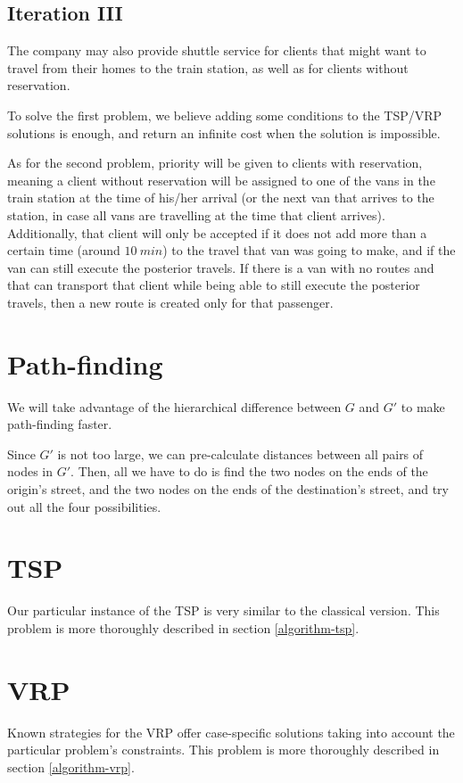 \subsection{Iteration III}
The company may also provide shuttle service for clients that might want to travel from their homes to the train station, as well as for clients without reservation.\par
To solve the first problem, we believe adding some conditions to the TSP/VRP solutions is enough, and return an infinite cost when the solution is impossible.\par
As for the second problem, priority will be given to clients with reservation, meaning a client without reservation will be assigned to one of the vans in the train station at the time of his/her arrival (or the next van that arrives to the station, in case all vans are travelling at the time that client arrives). Additionally, that client will only be accepted if it does not add more than a certain time (around $\SI{10}{min}$) to the travel that van was going to make, and if the van can still execute the posterior travels. If there is a van with no routes and that can transport that client while being able to still execute the posterior travels, then a new route is created only for that passenger.
\section{Path-finding} \label{problem-decomposition-pathfinding}
We will take advantage of the hierarchical difference between $G$ and $G'$ to make path-finding faster.\par
Since $G'$ is not too large, we can pre-calculate distances between all pairs of nodes in $G'$.
Then, all we have to do is find the two nodes on the ends of the origin's street, and the two nodes on the ends of the destination's street, and try out all the four possibilities.
\section{\texorpdfstring{\Acrlong*{TSP}}{Travelling salesman problem}} \label{problem-decomposition-tsp}
Our particular instance of the \acrshort{TSP} is very similar to the classical version. This problem is more thoroughly described in section \ref{algorithm-tsp}.
\section{\texorpdfstring{\Acrlong*{VRP}}{Vehicle routing problem}} \label{problem-decomposition-vrp}
Known strategies for the \acrshort{VRP} offer case-specific solutions taking into account the particular problem's constraints. This problem is more thoroughly described in section \ref{algorithm-vrp}.
